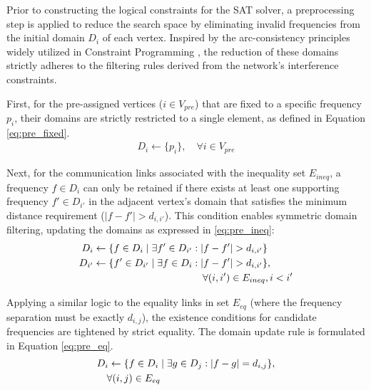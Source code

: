 \documentclass[letterpaper,journal]{IEEEtran}
\begin{document}
Prior to constructing the logical constraints for the SAT solver, a preprocessing step is applied to reduce the search space by eliminating invalid frequencies from the initial domain $D_i$ of each vertex. Inspired by the arc-consistency principles widely utilized in Constraint Programming \cite{Aardal2007, Dib2009}, the reduction of these domains strictly adheres to the filtering rules derived from the network's interference constraints.

First, for the pre-assigned vertices ($i \in V_{pre}$) that are fixed to a specific frequency $p_i$, their domains are strictly restricted to a single element, as defined in Equation \eqref{eq:pre_fixed}.
\begin{align}
    D_i \leftarrow \{p_i\}, \quad \forall i \in V_{pre} \label{eq:pre_fixed}
\end{align}

Next, for the communication links associated with the inequality set $E_{ineq}$, a frequency $f \in D_i$ can only be retained if there exists at least one supporting frequency $f' \in D_{i'}$ in the adjacent vertex's domain that satisfies the minimum distance requirement ($|f - f'| > d_{i,i'}$). This condition enables symmetric domain filtering, updating the domains as expressed in \eqref{eq:pre_ineq}:
\begin{align} 
D_i &\leftarrow \{ f \in D_i \mid \exists f' \in D_{i'} : |f - f'| > d_{i,i'} \} \notag \\ 
D_{i'} &\leftarrow \{ f' \in D_{i'} \mid \exists f \in D_i : |f - f'| > d_{i,i'} \}, \notag \\
& \qquad \qquad \qquad \qquad \qquad \quad \forall (i,i') \in E_{ineq}, i < i' \label{eq:pre_ineq}
\end{align}

Applying a similar logic to the equality links in set $E_{eq}$ (where the frequency separation must be exactly $d_{i,j}$), the existence conditions for candidate frequencies are tightened by strict equality. The domain update rule is formulated in Equation \eqref{eq:pre_eq}.
\begin{align}
    & D_i \leftarrow \{ f \in D_i \mid \exists g \in D_j : |f - g| = d_{i,j} \}, \notag \\
    & \quad \forall (i,j) \in E_{eq} \label{eq:pre_eq}
\end{align}
\end{document}
